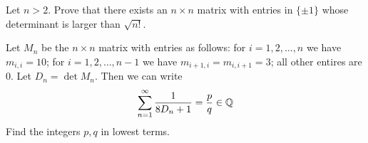 \documentclass{article}
\begin{document}


\begin{exercise}
            Let $n>2$. Prove that there exists an $n\times n$ matrix with entries in $\{\pm 1\}$ whose determinant is larger than $\sqrt{n!}$.
        \end{exercise}
        
        \begin{exercise}
            Let \(M_n\) be the \(n\times n\) matrix with entries as follows: for \(i=1,2,\ldots,n\) we have \(m_{i,i}=10\); for \(i=1,2,\ldots,n-1\) we have \(m_{i+1,i}=m_{i,i+1}=3\); all other entires are 0.
            Let \(D_n=\det M_n\).
            Then we can write
            \[\sum_{n=1}^\infty \frac{1}{8D_n+1} = \frac{p}{q}\in\mathbb{Q}\]
            Find the integers \(p,q\) in lowest terms.
        \end{exercise}
        
        
\end{document}
